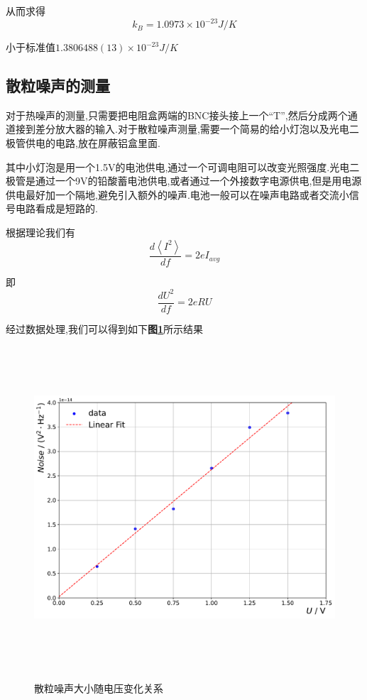 \documentclass[a4paper]{article}
\begin{document}
从而求得
\begin{equation}
    k_B=1.0973\times10^{-23}\si{J/K}
\end{equation}

小于标准值\(1.3806488(13)×10^{-23}\si{J/K}\)

\newpage
\subsection{散粒噪声的测量}\label{sub:2}
对于热噪声的测量,只需要把电阻盒两端的BNC接头接上一个“T”,然后分成两个通道接到差分放大器的输入.对于散粒噪声测量,需要一个简易的给小灯泡以及光电二极管供电的电路,放在屏蔽铝盒里面.

其中小灯泡是用一个1.5V的电池供电,通过一个可调电阻可以改变光照强度.光电二极管是通过一个9V的铅酸蓄电池供电,或者通过一个外接数字电源供电,但是用电源供电最好加一个隔地,避免引入额外的噪声.电池一般可以在噪声电路或者交流小信号电路看成是短路的.

根据理论我们有
\begin{equation}
    \frac{d\left<I^2\right>}{df}=2eI_{avg}
\end{equation}

即
\begin{equation}
    \frac{dU^2}{df}=2eRU
\end{equation}

经过数据处理,我们可以得到如下\textbf{图\ref{fig:fig4}}所示结果 
\begin{figure}[H]
 \centering
 \caption{散粒噪声大小随电压变化关系}
 \includegraphics[height=12cm, width=16cm]{images/phyex1_fig2.pdf}
 \label{fig:fig4}
\end{figure}
\end{document}
